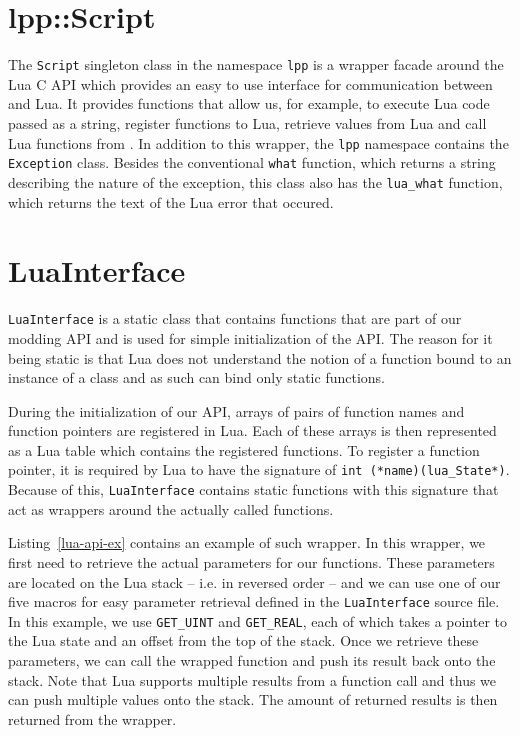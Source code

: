\section{lpp::Script}

The \texttt{Script} singleton class in the namespace \texttt{lpp} is a wrapper facade around the Lua C API which provides an easy to use
interface for communication between \cpp and Lua. It provides functions that allow us, for example, to execute Lua code passed as a string,
register \cpp functions to Lua, retrieve values from Lua and call Lua functions from \cpp. In addition to this wrapper, the \texttt{lpp}
namespace contains the \texttt{Exception} class. Besides the conventional \texttt{what} function, which returns a string describing the
nature of the exception, this class also has the \texttt{lua\_what} function, which returns the text of the Lua error that occured.

\section{LuaInterface}

\texttt{LuaInterface} is a static class that contains functions that are part of our modding API and is used for simple initialization
of the API. The reason for it being static is that Lua does not understand the notion of a function bound to an instance of a class
and as such can bind only static functions.

During the initialization of our API, arrays of pairs of function names and function pointers are registered in Lua. Each of
these arrays is then represented as a Lua table which contains the registered functions.
To register a function pointer, it is required by Lua to have the signature of \texttt{int (*name)(lua\_State*)}. Because of this,
\texttt{LuaInterface} contains static functions with this signature that act as wrappers around the actually called functions.

Listing~\ref{lua-api-ex} contains an example of such wrapper. In this wrapper, we first need to retrieve the actual parameters for our
functions. These parameters are located on the Lua stack -- i.e. in reversed order -- and we can use one of our five macros for easy
parameter retrieval defined in the \texttt{LuaInterface} source file. In this example, we use \texttt{GET\_UINT} and \texttt{GET\_REAL},
each of which takes a pointer to the Lua state and an offset from the top of the stack. Once we retrieve these parameters, we can call the
wrapped function and push its result back onto the stack. Note that Lua supports multiple results from a function call and thus we can
push multiple values onto the stack. The amount of returned results is then returned from the wrapper.

